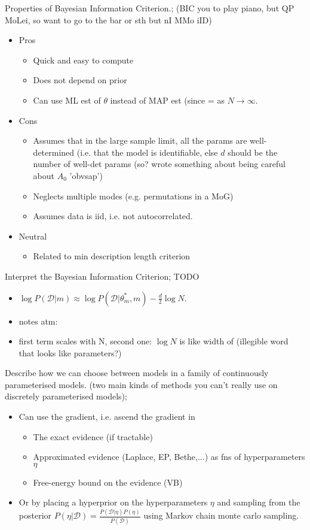\documentclass{article}
\begin{document}
Properties of Bayesian Information Criterion.; (BIC you to play piano, but QP MoLei, so want to go to the bar or sth but nI MMo iID) \begin{itemize} \item Pros \begin{itemize} \item Quick and easy to compute \item Does not depend on prior \item Can use ML est of $\theta$ instead of MAP est (since = as $N\rightarrow\infty$.  \end{itemize} \item Cons \begin{itemize} \item Assumes that in the large sample limit, all the params are well-determined (i.e. that the model is identifiable, else $d$ should be the number of well-det params (so? wrote something about being careful about $A_0$ 'obvsap') \item Neglects multiple modes (e.g. permutations in a MoG) \item Assumes data is iid, i.e. not autocorrelated.  \end{itemize} \item Neutral \begin{itemize} \item Related to min description length criterion \end{itemize} \end{itemize}

Interpret the Bayesian Information Criterion; TODO \begin{itemize} \item $\log P(\mathcal{D}|m)\approx \log P(\mathcal{D}|\theta^*_m, m)-\frac{d}{2}\log N$.  \item notes atm: \item first term scales with N, second one: $\log N$ is like width of (illegible word that looks like parameters?) \end{itemize}

Describe how we can choose between models in a family of continuously parameterised models. (two main kinds of methods you can't really use on discretely parameterised models); \begin{itemize} \item Can use the gradient, i.e. ascend the gradient in \begin{itemize} \item The exact evidence (if tractable) \item Approximated evidence (Laplace, EP, Bethe,...) as fns of hyperparameters $\eta$ \item Free-energy bound on the evidence (VB) \end{itemize} \item Or by placing a hyperprior on the hyperparameters $\eta$ and sampling from the posterior $P(\eta|\mathcal{D})=\frac{P(\mathcal{D}|\eta)P(\eta)}{P(\mathcal{D})}$ using Markov chain monte carlo sampling.  \end{itemize} 
\end{document}
